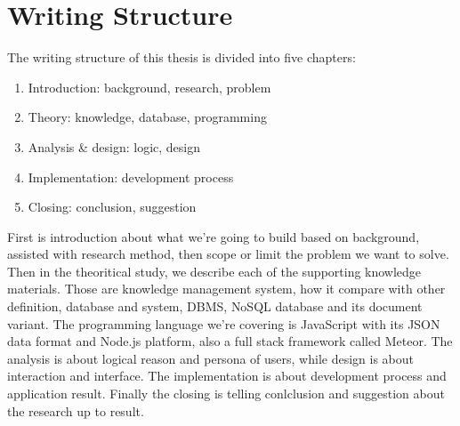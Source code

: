 \section{Writing Structure}
\label{sec:writing-structure}

The writing structure of this thesis is divided into five chapters:

\begin{enumerate}
\item Introduction: background, research, problem
\item Theory: knowledge, database, programming
\item Analysis \& design: logic, design
\item Implementation: development process
\item Closing: conclusion, suggestion
\end{enumerate}

First is introduction about what we're going to build based on background, assisted with research method, then scope or limit the problem we want to solve.
Then in the theoritical study, we describe each of the supporting knowledge materials.
Those are knowledge management system, how it compare with other definition, database and system, \ac{DBMS}, \ac{NoSQL} database and its document variant.
The programming language we're covering is JavaScript with its JSON data format and Node.js platform, also a full stack framework called Meteor.
The analysis is about logical reason and persona of users, while design is about interaction and interface.
The implementation is about development process and application result.
Finally the closing is telling conlclusion and suggestion about the research up to result.
